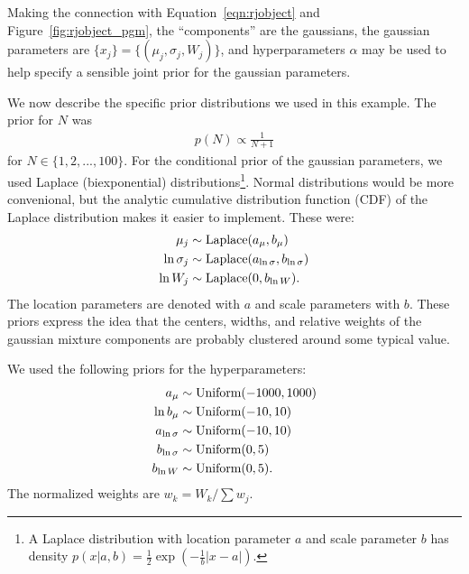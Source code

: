 \documentclass[article]{jss}
\begin{document}
Making the connection with Equation~\ref{eqn:rjobject} and
Figure~\ref{fig:rjobject_pgm}, the ``components'' are the gaussians,
the gaussian parameters are $\{x_j\} = \{(\mu_j, \sigma_j, W_j)\}$,
and hyperparameters $\alpha$ may be used to help specify
a sensible joint prior for the gaussian parameters.

We now describe the specific prior distributions we used in this example.
The prior for $N$ was
\begin{align}
p(N) \propto \frac{1}{N+1}
\end{align}
for $N \in \{1, 2, ..., 100\}$.
For the conditional prior of the gaussian parameters,
we used Laplace (biexponential)
distributions\footnote{A Laplace
distribution with location parameter $a$ and scale parameter
$b$ has density $p(x | a, b) = \frac{1}{2}\exp\left(-\frac{1}{b}|x - a|\right)$.}.
Normal distributions would be more convenional, but the analytic cumulative
distribution function (CDF) of the Laplace distribution makes it easier to
implement. These were:
\begin{align}
\mu_j &\sim \textnormal{Laplace}(a_\mu, b_\mu)\label{eqn:cond_prior1}\\
\ln\sigma_j &\sim \textnormal{Laplace}(a_{\ln\sigma}, b_{\ln\sigma})\label{eqn:cond_prior2}\\
\ln W_j &\sim \textnormal{Laplace}(0, b_{\ln W}).\label{eqn:cond_prior3}
\end{align}
The location parameters are denoted with $a$ and scale parameters with $b$.
These priors express the idea that the centers, widths, and relative weights
of the gaussian mixture components are probably clustered around some typical
value.

We used the following priors for the hyperparameters:
\begin{align}
a_\mu &\sim \textnormal{Uniform}(-1000, 1000)\\
\ln b_\mu &\sim \textnormal{Uniform}(-10, 10)\\
a_{\ln\sigma} &\sim \textnormal{Uniform}(-10, 10)\\
b_{\ln\sigma} &\sim \textnormal{Uniform}(0, 5)\\
b_{\ln W} &\sim \textnormal{Uniform}(0, 5).
\end{align}
The normalized weights are $w_k = W_k/\sum w_j$.
\end{document}
